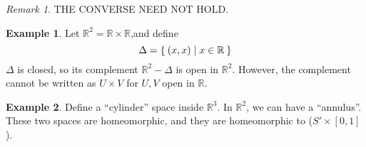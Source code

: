 \documentclass[12pt]{amsart}
\newcommand{\bbR}{\mathbb{R}}
\theoremstyle{plain}
\theoremstyle{remark}
\newtheorem*{rmk}{Remark}
\theoremstyle{definition}
\newtheorem*{eg}{Example}
\begin{document}
\begin{rmk}
	THE CONVERSE NEED NOT HOLD.
\end{rmk}

\begin{eg}
	Let $\bbR^2 = \bbR \times \bbR$,and define 
	\begin{equation*}
		\Delta = \Set{(x,x)| x \in \bbR}
	\end{equation*}
	$\Delta$ is closed, so its complement $\bbR^2 - \Delta$ is open in $\bbR^2$. However, the complement cannot be written as $U\times V$ for $U,V$ open in $\bbR$.
\end{eg}
\begin{eg}
Define a ``cylinder'' space inside $\bbR^3$. In $\bbR^2$, we can have a ``annulus''. These two spaces are homeomorphic, and they are homeomorphic to ($S'\times [0,1]$). 
\end{eg}
\end{document}
